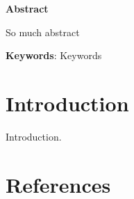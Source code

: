 \documentclass[degree=master]{sgthesis}
\newenvironment{abstractpage}{
    \clearpage
    \thispagestyle{empty}
    \begin{center}
    {\large \bfseries Abstract}
    \end{center}
}{
    \clearpage
}
\begin{document}
\makefrontmatter







\tableofcontents
\cleardoublepage
\listoffigures
\cleardoublepage
\listoftables
\cleardoublepage

\begin{abstractpage}
So much abstract

\noindent\textbf{Keywords}: Keywords
\end{abstractpage}
\cleardoublepage

% 
% 
\chapter{Introduction}
Introduction.

\chapter*{References}
\printbibliography[heading=none]
\cleardoublepage
\end{document}
